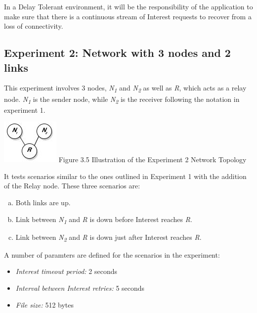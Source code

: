 \documentclass[a4paper,12pt]{report}      %
\begin{document}
In a Delay Tolerant environment, it will be the responsibility of the application to make sure that there
is a continuous stream of Interest requests to recover from a loss of connectivity.

\subsection{Experiment 2: Network with 3 nodes and 2 links}


This experiment involves 3 nodes, \emph{N\textsubscript{1}} and \emph{N\textsubscript{2}} as well as \emph{R}, which acts as a relay node. \emph{N\textsubscript{1}} is the sender node, while \emph{N\textsubscript{2}} is the receiver following the notation in experiment 1.

\begin{center}
\includegraphics[scale=0.75]{exp2topo.jpg}\newline
Figure 3.5 Illustration of the Experiment 2 Network Topology 
\end{center}

\noindent It tests scenarios similar to the ones outlined in Experiment 1 with the addition of the Relay node. These three scenarios are:
\begin{enumerate}[(a)]
\item Both links are up.
\item Link between \emph{N\textsubscript{1}} and \emph{R} is down before Interest reaches \emph{R}.
\item Link between \emph{N\textsubscript{2}} and \emph{R} is down just after Interest reaches \emph{R}.
\end{enumerate}

\noindent A number of paramters are defined for the scenarios in the experiment:
\begin{itemize}
\item \textsl{Interest timeout period:}  2 seconds
\item \textsl{Interval between Interest retries:} 5 seconds
\item \textsl{File size:} 512 bytes
\end{itemize}
\end{document}
